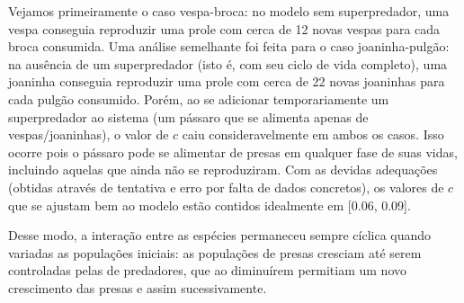 Vejamos primeiramente o caso vespa-broca: no modelo sem superpredador, uma vespa conseguia reproduzir uma prole com cerca de 12 novas vespas para cada broca consumida. Uma análise semelhante foi feita para o caso joaninha-pulgão: na ausência de um superpredador (isto é, com seu ciclo de vida completo), uma joaninha conseguia reproduzir uma prole com cerca de 22 novas joaninhas para cada pulgão consumido. Porém, ao se adicionar temporariamente um superpredador ao sistema (um pássaro que se alimenta apenas de vespas/joaninhas), o valor de $c$ caiu consideravelmente em ambos os casos. Isso ocorre pois o pássaro pode se alimentar de presas em qualquer fase de suas vidas, incluindo aquelas que ainda não se reproduziram. Com as devidas adequações (obtidas através de tentativa e erro por falta de dados concretos), os valores de $c$ que se ajustam bem ao modelo estão contidos idealmente em [0.06, 0.09].

Desse modo, a interação entre as espécies permaneceu sempre cíclica quando variadas as populações iniciais: as populações de presas cresciam até serem controladas pelas de predadores, que ao diminuírem permitiam um novo crescimento das presas e assim sucessivamente.
